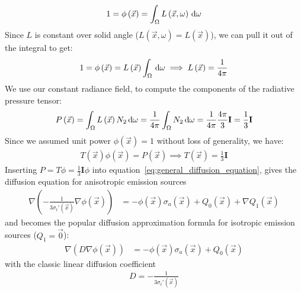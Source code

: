 \begin{align*}
1 = \phi\left(\vec{x}\right) = \int_\Omega{L\left(\vec{x}, \omega\right)\,\mathrm{d}\omega}
\end{align*}
Since $L$ is constant over solid angle ($L(\vec{x}, \omega)=L(\vec{x})$), we can pull it out of the integral to get:
\begin{align*}
1 = \phi\left(\vec{x}\right) = L\left(\vec{x}\right)\int_\Omega{\,\mathrm{d}\omega}\implies L\left(\vec{x}\right) = \frac{1}{4\pi}
\end{align*}
We use our constant radiance field, to compute the components of the radiative pressure tensor:
\begin{align*}
P\left(\vec{x}\right) 
= \int_\Omega{L\left(\vec{x}\right)N_2\,\mathrm{d}\omega}
= \frac{1}{4\pi}\int_\Omega{N_2\,\mathrm{d}\omega}
= \frac{1}{4\pi}\frac{4\pi}{3}\mathbf{I}
= \frac{1}{3}\mathbf{I}
\end{align*}
Since we assumed unit power $\phi(\vec{x})=1$ without loss of generality, we have:
\begin{align*}
T(\vec{x})\phi(\vec{x}) = P(\vec{x}) \implies T(\vec{x})=\frac{1}{3}\mathbf{I}
\end{align*}
Inserting $P=T\phi=\frac{1}{3}\mathbf{I}\phi$ into equation~\ref{eq:general_diffusion_equation}, gives the diffusion equation for anisotropic emission sources
\begin{align}
\label{eq:diffusion_equation_anisotropic_Q}
\nabla
\left(
-\frac{1}{3\sigma_t'\left(\vec{x}\right)}
\nabla \phi\left(\vec{x}\right)
\right)&=
-\phi(\vec{x})\sigma_a(\vec{x})
+Q_0\left(\vec{x}\right)
+\nabla Q_1\left(\vec{x}\right)
\end{align}
and becomes the popular diffusion approximation formula for isotropic emission sources ($Q_1=\vec{0}$):
\begin{align}
\label{eq:diffusion_equation_anisotropic_Q}
\nabla
\left(
D
\nabla \phi\left(\vec{x}\right)
\right)&=
-\phi(\vec{x})\sigma_a(\vec{x})
+Q_0\left(\vec{x}\right)
\end{align}
with the classic linear diffusion coefficient
\begin{align}
D=-\frac{1}{3\sigma_t'\left(\vec{x}\right)}
\end{align}


